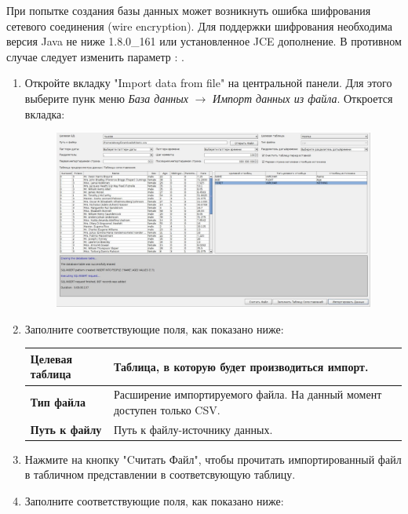 \begin{redremark}
При попытке создания базы данных может возникнуть ошибка шифрования сетевого соединения (wire encryption). Для поддержки шифрования необходима версия Java не ниже 1.8.0\_161 или установленное JCE дополнение. В противном случае следует изменить параметр : .
\end{redremark}


\begin{enumerate}
	\item Откройте вкладку "Import data from file" на центральной панели. Для этого выберите пунк меню \textit{База данных} $\rightarrow$ \textit{Импорт данных из файла}. Откроется вкладка:
	\begin{figure}[H]
		\centering
		\includegraphics[width = 0.95\linewidth]{img/ImportData.png}
	\end{figure}
	\item Заполните соответствующие поля, как показано ниже:
	\begin{longtable}[r]{|>{\bfseries}m{3.9cm}|m{11cm}|}
		\hline
		Целевая таблица & Таблица, в которую будет производиться импорт.\\\hline
		Тип файла & Расширение импортируемого файла. На данный момент доступен только CSV.\\\hline
		Путь к файлу & Путь к файлу-источнику данных.\\\hline
	\end{longtable}
	\item Нажмите на кнопку "Cчитать Файл", чтобы прочитать импортированный файл в табличном представлении в соответсвующую таблицу.
	\item Заполните соответствующие поля, как показано ниже:
	\begin{longtable}[r]{|>{\bfseries}m{3.9cm}|m{11cm}|}

\end{longtable}
\end{enumerate}
